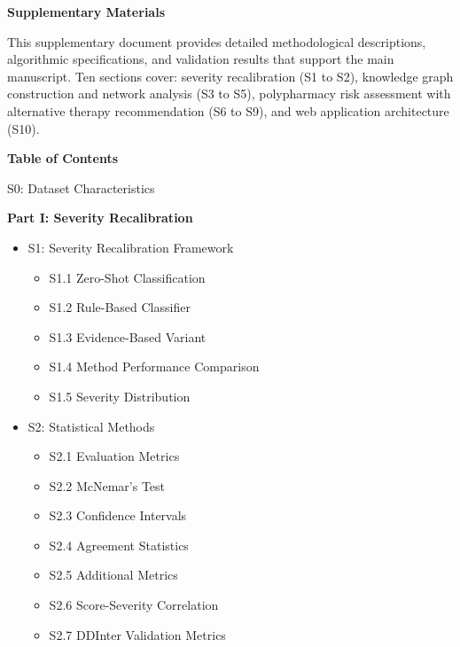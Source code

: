 \documentclass[12pt,a4paper]{article}
\begin{document}
\begin{center}
\Large\textbf{Supplementary Materials}
\end{center}

\vspace{0.5em}
\noindent
This supplementary document provides detailed methodological descriptions, algorithmic specifications, and validation results that support the main manuscript. Ten sections cover: severity recalibration (S1 to S2), knowledge graph construction and network analysis (S3 to S5), polypharmacy risk assessment with alternative therapy recommendation (S6 to S9), and web application architecture (S10).

\vspace{1em}
\noindent\textbf{Table of Contents}
\vspace{0.5em}

\noindent S0: Dataset Characteristics \dotfill \pageref{sec:s0}

\noindent\textbf{Part I: Severity Recalibration}
\begin{itemize}
    \setlength{\itemsep}{0pt}
    \item[] S1: Severity Recalibration Framework \dotfill \pageref{sec:s1}
    \begin{itemize}
        \setlength{\itemsep}{0pt}
        \item[] S1.1 Zero-Shot Classification
        \item[] S1.2 Rule-Based Classifier
        \item[] S1.3 Evidence-Based Variant
        \item[] S1.4 Method Performance Comparison
        \item[] S1.5 Severity Distribution
    \end{itemize}
    \item[] S2: Statistical Methods \dotfill \pageref{sec:s2}
    \begin{itemize}
        \setlength{\itemsep}{0pt}
        \item[] S2.1 Evaluation Metrics
        \item[] S2.2 McNemar's Test
        \item[] S2.3 Confidence Intervals
        \item[] S2.4 Agreement Statistics
        \item[] S2.5 Additional Metrics
        \item[] S2.6 Score-Severity Correlation
        \item[] S2.7 DDInter Validation Metrics
    \end{itemize}
\end{itemize}
\end{document}
